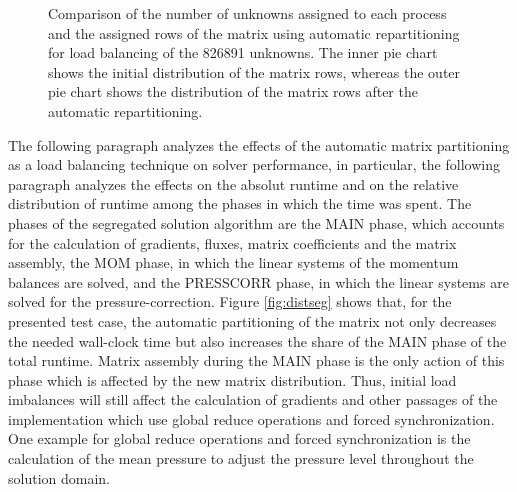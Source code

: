 \begin{figure}[h!]
\begin{minipage}{0.45\textwidth}
\end{minipage}
\caption{Comparison of the number of unknowns assigned to each process and the assigned rows of the matrix using automatic repartitioning for load balancing of the 826891 unknowns. The inner pie chart shows the initial distribution of the matrix rows, whereas the outer pie chart shows the distribution of the matrix rows after the automatic repartitioning.}
\label{fig:matpart}
\end{figure}

The following paragraph analyzes the effects of the automatic matrix partitioning as a load balancing technique on solver performance, in particular, the following paragraph analyzes the effects on the absolut runtime and on the relative distribution of runtime among the phases in which the time was spent. The phases of the segregated solution algorithm are the MAIN phase, which accounts for the calculation of gradients, fluxes, matrix coefficients and the matrix assembly, the MOM phase, in which the linear systems of the momentum balances are solved, and the PRESSCORR phase, in which the linear systems are solved for the pressure-correction. Figure \ref{fig:distseg} shows that, for the presented test case, the automatic partitioning of the matrix not only decreases the needed wall-clock time but also increases the share of the MAIN phase of the total runtime. Matrix assembly during the MAIN phase is the only action of this phase which is affected by the new matrix distribution. Thus, initial load imbalances will still affect the calculation of gradients and other passages of the implementation which use global reduce operations and forced synchronization. One example for global reduce operations and forced synchronization is the calculation of the mean pressure to adjust the pressure level throughout the solution domain. 

